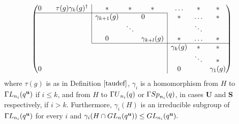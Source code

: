 \begin{Lem}
\begin{equation}
{\begin{pmatrix}
0        & & \multicolumn{1}{l|}{\tau(g)\gamma_{k}(g)^{\dagger}}&* &* &* &\ldots &*    &* \\  \cline{1-6}
        & & \multicolumn{1}{l|}{} &\gamma_{k+1}(g) & & \multicolumn{1}{l|}{0}  &* & \ldots   &*\\ 
        & &  \multicolumn{1}{l|}{}& &\ddots &\multicolumn{1}{l|}{}       & & \ddots   &\\
        & &  \multicolumn{1}{l|}{}&0 & &\multicolumn{1}{l|}{\gamma_{k+l}(g)}    & * & \ldots   & *\\ \cline{4-9} 
        & & & & &\multicolumn{1}{l|}{} & \gamma_{k}(g) &  *  &* \\
        & & & & &\multicolumn{1}{l|}{} & & \ddots   &*\\
0        & & & & &\multicolumn{1}{l|}{} &0 &    & \gamma_{1}(g)\\  
\end{pmatrix}}
\end{equation}
where $\tau(g)$ is as in Definition $\ref{taudef}$, $\gamma_i$ is a homomorphism from $H$ to ${{\Gamma L}}_{n_i}(q^{\bf u})$ if $i \le k$, and from $H$ to ${{\Gamma U}}_{n_i}(q)$ or ${{\Gamma Sp}}_{n_i}(q)$, in cases {\bf U} and {\bf S} respectively, if $i>k.$ Furthermore, $\gamma_i(H)$ is an irreducible subgroup of ${{\Gamma L}}_{n_i}(q^{\bf u})$ for every $i$ and $\gamma_i(H \cap GL_n(q^{\bf u})) \le GL_{n_i}(q^{\bf u}).$ 
\end{Lem}
